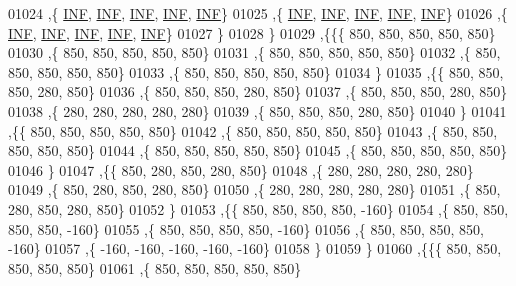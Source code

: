 \begin{DoxyCode}
01024    ,\{   \mbox{\hyperlink{energy__const_8h_a12c2040f25d8e3a7b9e1c2024c618cb6}{INF}},   \mbox{\hyperlink{energy__const_8h_a12c2040f25d8e3a7b9e1c2024c618cb6}{INF}},   \mbox{\hyperlink{energy__const_8h_a12c2040f25d8e3a7b9e1c2024c618cb6}{INF}},   \mbox{\hyperlink{energy__const_8h_a12c2040f25d8e3a7b9e1c2024c618cb6}{INF}},   \mbox{\hyperlink{energy__const_8h_a12c2040f25d8e3a7b9e1c2024c618cb6}{INF}}\}
01025    ,\{   \mbox{\hyperlink{energy__const_8h_a12c2040f25d8e3a7b9e1c2024c618cb6}{INF}},   \mbox{\hyperlink{energy__const_8h_a12c2040f25d8e3a7b9e1c2024c618cb6}{INF}},   \mbox{\hyperlink{energy__const_8h_a12c2040f25d8e3a7b9e1c2024c618cb6}{INF}},   \mbox{\hyperlink{energy__const_8h_a12c2040f25d8e3a7b9e1c2024c618cb6}{INF}},   \mbox{\hyperlink{energy__const_8h_a12c2040f25d8e3a7b9e1c2024c618cb6}{INF}}\}
01026    ,\{   \mbox{\hyperlink{energy__const_8h_a12c2040f25d8e3a7b9e1c2024c618cb6}{INF}},   \mbox{\hyperlink{energy__const_8h_a12c2040f25d8e3a7b9e1c2024c618cb6}{INF}},   \mbox{\hyperlink{energy__const_8h_a12c2040f25d8e3a7b9e1c2024c618cb6}{INF}},   \mbox{\hyperlink{energy__const_8h_a12c2040f25d8e3a7b9e1c2024c618cb6}{INF}},   \mbox{\hyperlink{energy__const_8h_a12c2040f25d8e3a7b9e1c2024c618cb6}{INF}}\}
01027    \}
01028   \}
01029  ,\{\{\{   850,   850,   850,   850,   850\}
01030    ,\{   850,   850,   850,   850,   850\}
01031    ,\{   850,   850,   850,   850,   850\}
01032    ,\{   850,   850,   850,   850,   850\}
01033    ,\{   850,   850,   850,   850,   850\}
01034    \}
01035   ,\{\{   850,   850,   850,   280,   850\}
01036    ,\{   850,   850,   850,   280,   850\}
01037    ,\{   850,   850,   850,   280,   850\}
01038    ,\{   280,   280,   280,   280,   280\}
01039    ,\{   850,   850,   850,   280,   850\}
01040    \}
01041   ,\{\{   850,   850,   850,   850,   850\}
01042    ,\{   850,   850,   850,   850,   850\}
01043    ,\{   850,   850,   850,   850,   850\}
01044    ,\{   850,   850,   850,   850,   850\}
01045    ,\{   850,   850,   850,   850,   850\}
01046    \}
01047   ,\{\{   850,   280,   850,   280,   850\}
01048    ,\{   280,   280,   280,   280,   280\}
01049    ,\{   850,   280,   850,   280,   850\}
01050    ,\{   280,   280,   280,   280,   280\}
01051    ,\{   850,   280,   850,   280,   850\}
01052    \}
01053   ,\{\{   850,   850,   850,   850,  -160\}
01054    ,\{   850,   850,   850,   850,  -160\}
01055    ,\{   850,   850,   850,   850,  -160\}
01056    ,\{   850,   850,   850,   850,  -160\}
01057    ,\{  -160,  -160,  -160,  -160,  -160\}
01058    \}
01059   \}
01060  ,\{\{\{   850,   850,   850,   850,   850\}
01061    ,\{   850,   850,   850,   850,   850\}

\end{DoxyCode}
